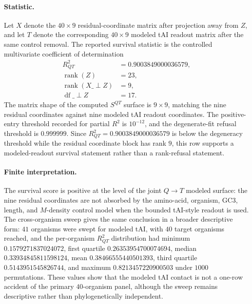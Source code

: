 \paragraph{Statistic.}
Let $X$ denote the $40 \times 9$ residual-coordinate matrix after projection away from $Z$, and let $T$ denote the corresponding $40 \times 9$ modeled tAI readout matrix after the same control removal.  The reported survival statistic is the controlled multivariate coefficient of determination
$$
\begin{aligned}
R^{2}_{QT} &= 0.9003849000036579,\\
\operatorname{rank}(Z) &= 23,\\
\operatorname{rank}(X\_{\perp Z}) &= 9,\\
\operatorname{df}\_{\perp Z} &= 17.
\end{aligned}
$$
The matrix shape of the computed $S^{QT}$ surface is $9 \times 9$, matching the nine residual coordinates against nine modeled tAI readout coordinates.  The positive-entry threshold recorded for partial $R^{2}$ is $10^{-12}$, and the degenerate-fit refusal threshold is $0.999999$.  Since $R^{2}_{QT}=0.9003849000036579$ is below the degeneracy threshold while the residual coordinate block has rank $9$, this row supports a modeled-readout survival statement rather than a rank-refusal statement.

\paragraph{Finite interpretation.}
The survival score is positive at the level of the joint $Q \to T$ modeled surface: the nine residual coordinates are not absorbed by the amino-acid, organism, GC3, length, and $M$-density control model when the bounded tAI-style readout is used.  The cross-organism sweep gives the same conclusion in a broader descriptive form: $41$ organisms were swept for modeled tAI, with $40$ target organisms reached, and the per-organism $R^{2}_{QT}$ distribution had minimum $0.1579271837024072$, first quartile $0.26353954700074694$, median $0.33934845811598124$, mean $0.38466555440501393$, third quartile $0.5143951545826744$, and maximum $0.8213457220900503$ under $1000$ permutations.  These values show that the modeled tAI contact is not a one-row accident of the primary $40$-organism panel, although the sweep remains descriptive rather than phylogenetically independent.

